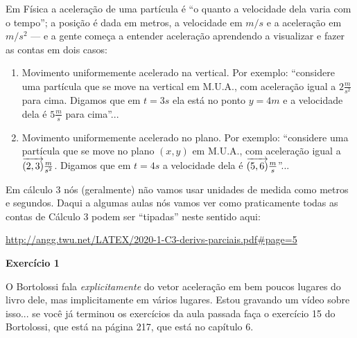 \documentclass[oneside,12pt]{article}
\begin{document}

Em Física a aceleração de uma partícula é ``o quanto a velocidade dela
varia com o tempo''; a posição é dada em metros, a velocidade em $m/s$
e a aceleração em $m/s^2$ --- e a gente começa a entender aceleração
aprendendo a visualizar e fazer as contas em dois casos:

\begin{enumerate}

\item Movimento uniformemente acelerado na vertical. Por exemplo:
  ``considere uma partícula que se move na vertical em M.U.A., com
  aceleração igual a $2 \frac{m}{s^2}$ para cima. Digamos que em
  $t=3s$ ela está no ponto $y=4m$ e a velocidade dela é $5
  \frac{m}{s}$ para cima''...

\item Movimento uniformemente acelerado no plano. Por exemplo:
  ``considere uma partícula que se move no plano $(x,y)$ em M.U.A.,
  com aceleração igual a ${\overrightarrow{(2,3)}} \frac{m}{s^2}$. Digamos que em
  $t=4s$ a velocidade dela é ${\overrightarrow{(5,6)}} \frac{m}{s}$''...

\end{enumerate}

\newpage

Em cálculo 3 nós (geralmente) não vamos usar unidades de medida como
metros e segundos. Daqui a algumas aulas nós vamos ver como
praticamente todas as contas de Cálculo 3 podem ser ``tipadas'' neste
sentido aqui:

{\footnotesize

\url{http://angg.twu.net/LATEX/2020-1-C3-derivs-parciais.pdf\#page=5}

}


\bsk
\bsk

{\bf Exercício 1}

O Bortolossi fala {\sl explicitamente} do vetor aceleração em bem
poucos lugares do livro dele, mas implicitamente em vários lugares.
Estou gravando um vídeo sobre isso... se você já terminou os
exercícios da aula passada faça o exercício 15 do Bortolossi, que está
na página 217, que está no capítulo 6.




\end{document}
